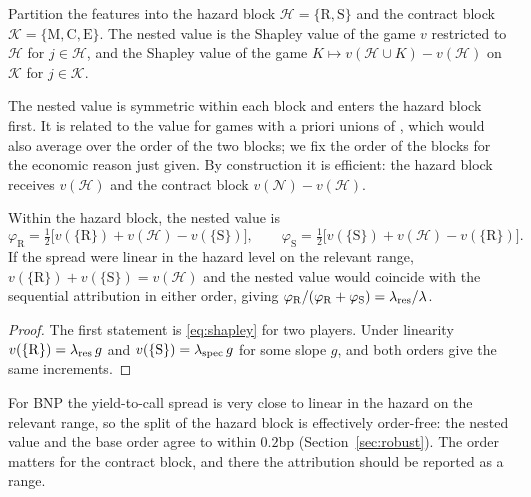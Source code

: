 \begin{definition}
Partition the features into the hazard block $\mathcal H=\{\mathrm R,\mathrm S\}$ and the
contract block $\mathcal K=\{\mathrm M,\mathrm C,\mathrm E\}$. The nested value is the
Shapley value of the game $v$ restricted to $\mathcal H$ for $j\in\mathcal H$, and the
Shapley value of the game $K\mapsto v(\mathcal H\cup K)-v(\mathcal H)$ on $\mathcal K$ for
$j\in\mathcal K$.
\end{definition}

The nested value is symmetric within each block and enters the hazard block first. It is
related to the value for games with a priori unions of \citet{Owen1977}, which would also
average over the order of the two blocks; we fix the order of the blocks for the economic
reason just given. By construction it is efficient: the hazard block receives
$v(\mathcal H)$ and the contract block $v(\mathcal N)-v(\mathcal H)$.

\begin{proposition}\label{prop:hazardsplit}
Within the hazard block, the nested value is
\[
  \varphi_{\mathrm R}=\tfrac12\bigl[v(\{\mathrm R\})+v(\mathcal H)-v(\{\mathrm S\})\bigr],\qquad
  \varphi_{\mathrm S}=\tfrac12\bigl[v(\{\mathrm S\})+v(\mathcal H)-v(\{\mathrm R\})\bigr].
\]
If the spread were linear in the hazard level on the relevant range,
$v(\{\mathrm R\})+v(\{\mathrm S\})=v(\mathcal H)$ and the nested value would coincide with
the sequential attribution in either order, giving
$\varphi_{\mathrm R}/(\varphi_{\mathrm R}+\varphi_{\mathrm S})=\lambda_{\mathrm{res}}/\lambda$.
\end{proposition}

\begin{proof}
The first statement is \eqref{eq:shapley} for two players. Under linearity
$v(\{\mathrm R\})=\lambda_{\mathrm{res}}\,g$ and $v(\{\mathrm S\})=\lambda_{\mathrm{spec}}\,g$ for some slope $g$, and both
orders give the same increments.
\end{proof}

For BNP the yield-to-call spread is very close to linear in the hazard on the relevant
range, so the split of the hazard block is effectively order-free: the nested value and
the base order agree to within $0.2$bp (Section~\ref{sec:robust}). The order matters for the
contract block, and there the attribution should be reported as a range.

